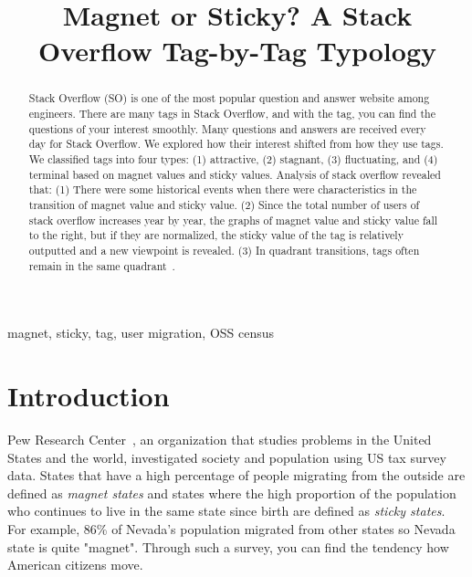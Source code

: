 \documentclass[conference]{IEEEtran}
\begin{document}
\title{Magnet or Sticky? A Stack Overflow Tag-by-Tag Typology\\
}

\maketitle

\begin{abstract}
Stack Overflow (SO) is one of the most popular question and answer website among engineers. There are many tags in Stack Overflow, and with the tag, you can find the questions of your interest smoothly. Many questions and answers are received every day for Stack Overflow. We explored how their interest shifted from how they use tags. We classified tags into four types: (1) attractive, (2) stagnant, (3) fluctuating, and (4) terminal based on magnet values and sticky values. Analysis of stack overflow revealed that: 
(1) There were some historical events when there were characteristics in the transition of magnet value and sticky value.
(2) Since the total number of users of stack overflow increases year by year, the graphs of magnet value and sticky value fall to the right, but if they are normalized, the sticky value of the tag is relatively outputted and a new viewpoint is revealed.
(3) In quadrant transitions, tags often remain in the same quadrant~\cite{yamashita2014magnet}.\\
\end{abstract}

\begin{IEEEkeywords}
magnet, sticky, tag, user migration, OSS census
\end{IEEEkeywords}

\section{Introduction}
Pew Research Center~\cite{communityeconomic}, an organization that studies problems in the United States and the world, investigated society and population using US tax survey data.  States that have a high percentage of people migrating from the outside are defined as \emph{magnet states} and states where the high proportion of the population who continues to live in the same state since birth are defined as \emph{sticky states}. For example, 86\% of Nevada's population migrated from other states so Nevada state is quite "magnet". Through such a survey, you can find the tendency how American citizens move.
\end{document}
